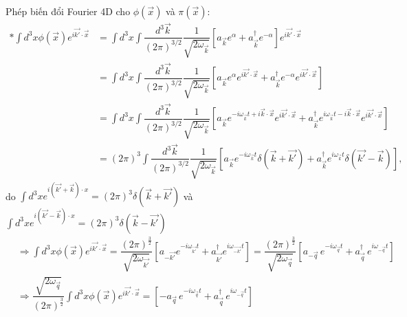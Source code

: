 \documentclass{report}
\begin{document}
Phép biến đổi Fourier 4D cho $\phi(\vec{x})$ và $\pi(\vec{x})$:
\begin{align*}
	\ast\int d^3x \phi(\vec{x}) e^{i\vec{k'}\cdot\vec{x}} & = \int d^3x \int \dfrac{d^3\vec{k}}{(2\pi)^{3/2}} \dfrac{1}{\sqrt{2\omega_{\vec{k}}}}\left[ a_{\vec{k}}e^\alpha + a_{\vec{k}}^\dagger e^{-\alpha} \right] e^{i\vec{k'}\cdot\vec{x}}                                                                                                        \\
	                                                      & = \int d^3x \int \dfrac{d^3\vec{k}}{(2\pi)^{3/2}} \dfrac{1}{\sqrt{2\omega_{\vec{k}}}} \left[ a_{\vec{k}}e^\alpha e^{i\vec{k'}\cdot\vec{x}}  + a_{\vec{k}}^\dagger e^{-\alpha}e^{i\vec{k'}\cdot\vec{x}} \right]                                                                             \\
	                                                      & = \int d^3x \int \dfrac{d^3\vec{k}}{(2\pi)^{3/2}} \dfrac{1}{\sqrt{2\omega_{\vec{k}}}} \left[ a_{\vec{k}}e^{ -i\omega_{\vec{k}} t + i\vec{k}\cdot\vec{x}} e^{i\vec{k'}\cdot\vec{x}}  + a_{\vec{k}}^\dagger e^{ i\omega_{\vec{k}} t - i\vec{k}\cdot\vec{x}}e^{i\vec{k'}\cdot\vec{x}} \right] \\
	                                                      & = (2\pi)^3 \int \dfrac{d^3\vec{k}}{(2\pi)^{3/2}} \dfrac{1}{\sqrt{2\omega_{\vec{k}}}} \left[ a_{\vec{k}}e^{-i\omega_{\vec{k}}t} \delta(\vec{k}+\vec{k'}) + a_{\vec{k}}^\dagger e^{i\omega_{\vec{k}}t}\delta(\vec{k'}-\vec{k}) \right],
\end{align*}
do $\displaystyle \int d^3x e^{i(\vec{k'}+\vec{k})\cdot x} = (2\pi)^3\delta(\vec{k}+\vec{k'})$ và $\displaystyle \int d^3x e^{i(\vec{k'}-\vec{k})\cdot x} = (2\pi)^3\delta(\vec{k}-\vec{k'})$
\begin{align}
	&\Rightarrow \int d^3x \phi(\vec{x}) e^{i\vec{k'}\cdot\vec{x}}
	  = \dfrac{(2\pi)^{\frac{3}{2}}}{\sqrt{2\omega_{\vec{k'}}}}\left[ a_{-\vec{k'}}e^{-i\omega_{\vec{k'}}t} + a_{\vec{k'}}^{\dagger}e^{i\omega_{\vec{-k'}}t} \right]
	= \dfrac{(2\pi)^{\frac{3}{2}}}{\sqrt{2\omega_{\vec{q}}}}\left[ a_{-\vec{q}}\,e^{-i\omega_{\vec{q}}t} + a_{\vec{q}}^{\dagger}\,e^{i\omega_{-\vec{q}}t} \right]  \nonumber \\
	&\Rightarrow \dfrac{\sqrt{2\omega_{\vec{q}}}}{(2\pi)^{\frac{3}{2}}} \int d^3x \phi(\vec{x}) e^{i\vec{k'}\cdot\vec{x}}
	  = \left[ -a_{\vec{q}}\,e^{-i\omega_{\vec{q}}t} + a_{\vec{q}}^{\dagger}\,e^{i\omega_{-\vec{q}}t} \right] \label{eq1}
\end{align}
\end{document}
